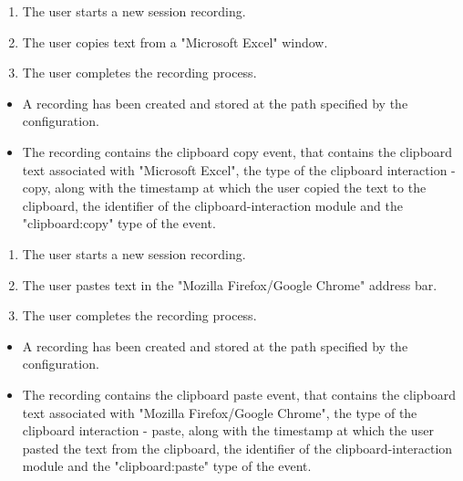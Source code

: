 \begin{tests}
	{\begin{enumerate}
		\item The \gls{user} starts a new \gls{session} recording.
		\item The \gls{user} copies text from a "Microsoft Excel" window.
		\item The \gls{user} completes the recording process.
	\end{enumerate}}
	{\begin{itemize}
		\item A recording has been created and stored at the path specified by the configuration.
		\item The recording contains the clipboard copy \gls{event},  that contains the clipboard text associated with "Microsoft Excel", the type of the clipboard interaction - copy, along with the timestamp at which the \gls{user} copied the text to the clipboard, the identifier of the clipboard-interaction module and the "clipboard:copy" type of the event.
	\end{itemize}}
	
	{\begin{enumerate}
		\item The \gls{user} starts a new \gls{session} recording.
		\item The \gls{user} pastes text in the "Mozilla Firefox/Google Chrome" address bar.
		\item The \gls{user} completes the recording process.
	\end{enumerate}}
	{\begin{itemize}
		\item A recording has been created and stored at the path specified by the configuration.
		\item The recording contains the clipboard paste \gls{event},  that contains the clipboard text associated with "Mozilla Firefox/Google Chrome", the type of the clipboard interaction - paste, along with the timestamp at which the \gls{user} pasted the text from the clipboard, the identifier of the clipboard-interaction module and the "clipboard:paste" type of the event.
	\end{itemize}}
\end{tests}

